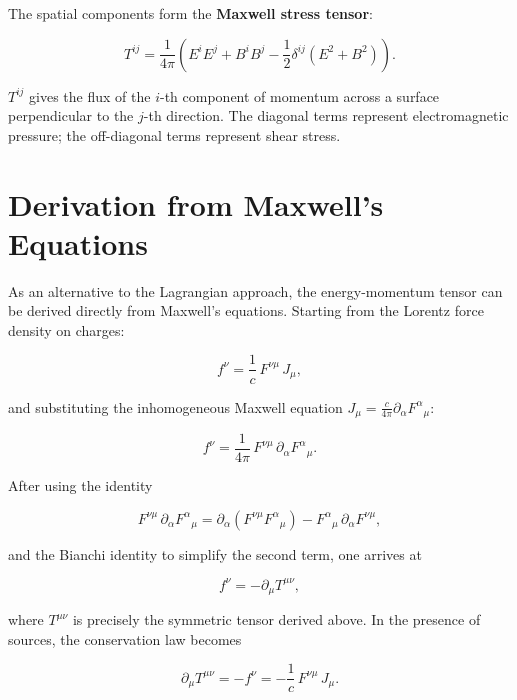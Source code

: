 The spatial components form the \textbf{Maxwell stress tensor}:

\begin{equation}
\boxed{T^{ij} = \frac{1}{4\pi}\!\left(E^i E^j + B^i B^j - \frac{1}{2}\delta^{ij}(E^2 + B^2)\right).}
\end{equation}

$T^{ij}$ gives the flux of the $i$-th component of momentum across a surface perpendicular to the $j$-th direction. The diagonal terms represent electromagnetic pressure; the off-diagonal terms represent shear stress.

\section{Derivation from Maxwell's Equations}

As an alternative to the Lagrangian approach, the energy-momentum tensor can be derived directly from Maxwell's equations. Starting from the Lorentz force density on charges:

\begin{equation}
f^\nu = \frac{1}{c}\,F^{\nu\mu}\,J_\mu,
\end{equation}

and substituting the inhomogeneous Maxwell equation $J_\mu = \frac{c}{4\pi}\partial_\alpha F^{\alpha}{}_\mu$:

\begin{equation}
f^\nu = \frac{1}{4\pi}\,F^{\nu\mu}\,\partial_\alpha F^{\alpha}{}_\mu.
\end{equation}

After using the identity

\begin{equation}
F^{\nu\mu}\,\partial_\alpha F^{\alpha}{}_\mu = \partial_\alpha(F^{\nu\mu}F^{\alpha}{}_\mu) - F^{\alpha}{}_\mu\,\partial_\alpha F^{\nu\mu},
\end{equation}

and the Bianchi identity to simplify the second term, one arrives at

\begin{equation}
f^\nu = -\partial_\mu T^{\mu\nu},
\end{equation}

where $T^{\mu\nu}$ is precisely the symmetric tensor derived above. In the presence of sources, the conservation law becomes

\begin{equation}
\boxed{\partial_\mu T^{\mu\nu} = -f^\nu = -\frac{1}{c}\,F^{\nu\mu}\,J_\mu.}
\end{equation}

